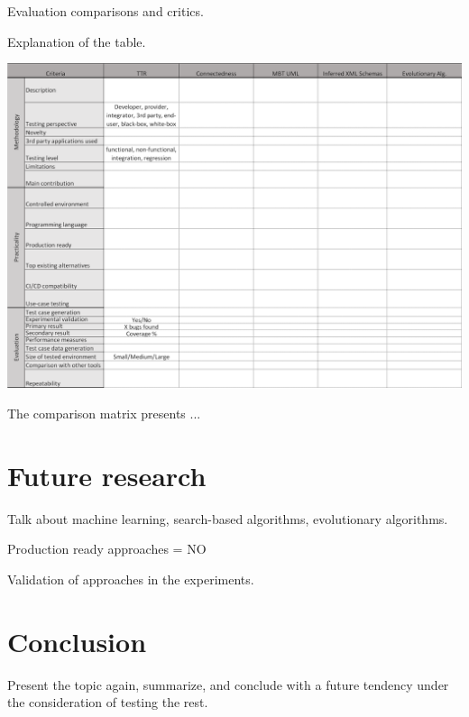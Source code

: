 \documentclass[english]{tktltiki}
\begin{document}
Evaluation comparisons and critics.

Explanation of the table.

\begin{table}[h]
	\begin{center}
		\hspace*{-1.25cm}
		\includegraphics[width=1.1\textwidth]{images/comparison.png}
		\caption{The comparison matrix presents ...}
		\label{table:comparison}
	\end{center}
\end{table}

\section{Future research}
Talk about machine learning, search-based algorithms, evolutionary algorithms.

Production ready approaches = NO

Validation of approaches in the experiments. 

\section{Conclusion}
Present the topic again, summarize, and conclude with a future tendency under the consideration of testing the rest.

\newpage
\nocite{*}
%
%


%



\lastpage
\end{document}
